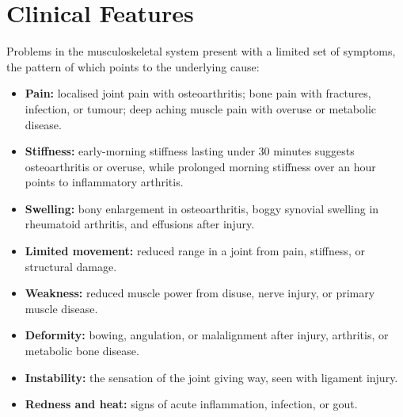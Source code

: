 \section*{Clinical Features}
Problems in the musculoskeletal system present with a limited set of symptoms, the pattern of which points to the underlying cause:
\begin{itemize}
    \item \textbf{Pain:} localised joint pain with osteoarthritis; bone pain with fractures, infection, or tumour; deep aching muscle pain with overuse or metabolic disease.
    \item \textbf{Stiffness:} early-morning stiffness lasting under 30 minutes suggests osteoarthritis or overuse, while prolonged morning stiffness over an hour points to inflammatory arthritis.
    \item \textbf{Swelling:} bony enlargement in osteoarthritis, boggy synovial swelling in rheumatoid arthritis, and effusions after injury.
    \item \textbf{Limited movement:} reduced range in a joint from pain, stiffness, or structural damage.
    \item \textbf{Weakness:} reduced muscle power from disuse, nerve injury, or primary muscle disease.
    \item \textbf{Deformity:} bowing, angulation, or malalignment after injury, arthritis, or metabolic bone disease.
    \item \textbf{Instability:} the sensation of the joint giving way, seen with ligament injury.
    \item \textbf{Redness and heat:} signs of acute inflammation, infection, or gout.
\end{itemize}

